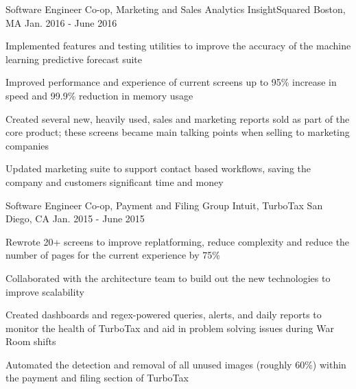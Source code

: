 

\begin{cventries}


  \cventry
    {Software Engineer Co-op, Marketing and Sales Analytics} %
    {InsightSquared} %
    {Boston, MA} %
    {Jan. 2016 - June 2016} %
    {
      \begin{cvitems} %
        \item {Implemented features and testing utilities to improve the accuracy of the machine learning predictive forecast suite}
        \item {Improved performance and experience of current screens up to 95\% increase in speed and 99.9\% reduction in memory usage}
        \item {Created several new, heavily used, sales and marketing reports sold as part of the core product; these screens became main talking points when selling to marketing companies}
        \item {Updated marketing suite to support contact based workflows, saving the company and customers significant time and money}
      \end{cvitems}
    }

  \cventry
    {Software Engineer Co-op, Payment and Filing Group} %
    {Intuit, TurboTax} %
    {San Diego, CA} %
    {Jan. 2015 - June 2015} %
    {
      \begin{cvitems} %
        \item {Rewrote 20+ screens to improve replatforming, reduce complexity and reduce the number of pages for the current experience by 75\%}
        \item {Collaborated with the architecture team to build out the new technologies to improve scalability}
        \item {Created dashboards and regex-powered queries, alerts, and daily reports to monitor the health of TurboTax and aid in problem solving issues during War Room shifts}
        \item {Automated the detection and removal of all unused images (roughly 60\%) within the payment and filing section of TurboTax}
      \end{cvitems}
    }


\end{cventries}
